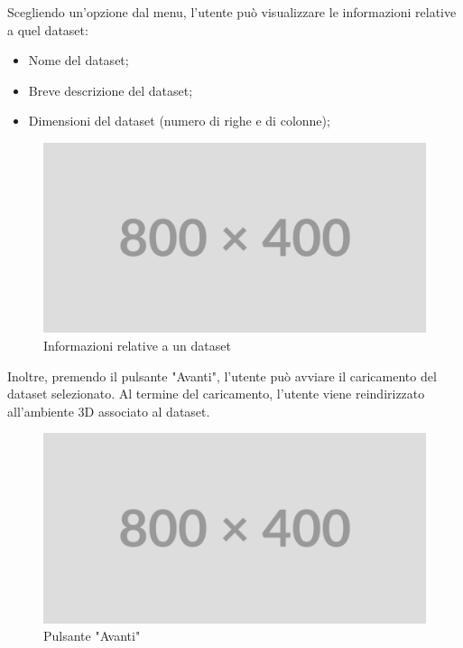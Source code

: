 Scegliendo un'opzione dal menu, l'utente può visualizzare le informazioni
relative a quel dataset:
\begin{itemize}
    \item Nome del dataset;
    \item Breve descrizione del dataset;
    \item Dimensioni del dataset (numero di righe e di colonne);
\end{itemize}
\begin{figure}[ht!]
    \centering
    \includegraphics[scale=0.6]{template/images/placeholder.png}
    \caption{Informazioni relative a un dataset}
\end{figure}
Inoltre, premendo il pulsante "Avanti", l'utente può avviare il caricamento del
dataset selezionato. Al termine del caricamento, l'utente viene reindirizzato
all'ambiente 3D associato al dataset.
\begin{figure}[ht!]
    \centering
    \includegraphics[scale=0.6]{template/images/placeholder.png}
    \caption{Pulsante "Avanti"}
\end{figure}

